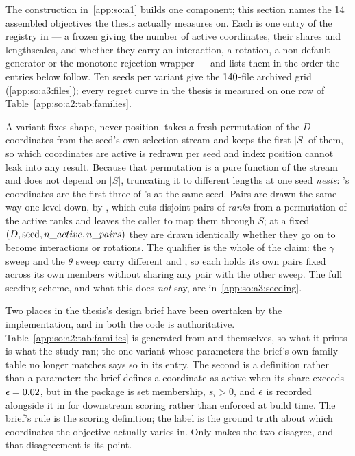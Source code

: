 \label{app:so:a2}

The construction in~\ref{app:so:a1} builds one component; this section names
the $14$ assembled objectives the thesis actually measures on. Each is
one entry of the  registry in  ---
a frozen  giving the number of active coordinates, their
shares and lengthscales, and whether they carry an interaction, a rotation, a
non-default generator or the monotone rejection wrapper --- and
 lists them in the order the entries below follow. Ten
seeds per variant give the $140$-file archived grid
(\ref{app:so:a3:files}); every regret curve in the thesis is measured on one
row of Table~\ref{app:so:a2:tab:families}.

A variant fixes shape, never position.  takes a fresh
permutation of the $D$ coordinates from the seed's own selection stream and
keeps the first $|S|$ of them, so which coordinates are active is redrawn per
seed and index position cannot leak into any result. Because that permutation
is a pure function of the stream and does not depend on $|S|$, truncating it to
different lengths at one seed \emph{nests}: 's coordinates are
the first three of 's at the same seed. Pairs are drawn the
same way one level down, by , which cuts disjoint pairs of
\emph{ranks} from a permutation of the active ranks and leaves the caller to map
them through $S$; at a fixed
$(D, \text{seed}, \SOcode{n\_active}, \SOcode{n\_pairs})$ they are drawn
identically whether they go on to become interactions or rotations. The
qualifier is the whole of the claim: the $\gamma$ sweep and the $\theta$ sweep
carry different  and , so each holds its own
pairs fixed across its own members without sharing any pair with the other
sweep. The full seeding scheme, and what this does \emph{not} say, are
in~\ref{app:so:a3:seeding}.

Two places in the thesis's design brief have been overtaken by the
implementation, and in both the code is authoritative.
Table~\ref{app:so:a2:tab:families} is generated from  and
 themselves, so what it prints is what the study ran; the
one variant whose parameters the brief's own family table no longer matches
says so in its entry. The second is a definition rather than a parameter: the
brief defines a coordinate as active when its share exceeds
$\epsilon=0.02$, but  in the package is set
membership, $s_i>0$, and $\epsilon$ is recorded alongside it in
 for downstream scoring rather than enforced at build
time. The brief's rule is the scoring definition; the label is the ground truth
about which coordinates the objective actually varies in. Only
 makes the two disagree, and that disagreement is its point.

